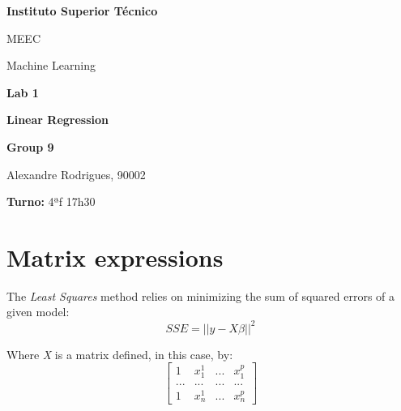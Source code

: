 \documentclass[a4paper,2pt]{report}
\begin{document}
\begin{titlepage}
    \begin{center}
        \vspace*{3cm}
 
        \LARGE
        \textbf{Instituto Superior Técnico}
        \vskip 0.4cm
 
        \Large{MEEC}
        \vskip 0.2cm

        \Large{Machine Learning}
        \vskip 3cm
        

 
        \Huge{\textbf{Lab 1}}
        \vskip 0.5cm

        \huge{\textbf{Linear Regression}}
        \vskip 0.5cm

 
        \vfill
 
        \large
        \textbf{Group 9}\\
        \vspace{0.3cm}
        
        Alexandre Rodrigues, 90002\\
        
        \vspace{1cm}

        \textbf{Turno:} 4ªf 17h30

    \end{center}
\end{titlepage}

\tableofcontents
\newpage

\setcounter{chapter}{1}
\section{Matrix expressions}

    \par The \textit{Least Squares} method relies on minimizing the sum of squared errors of a given model:
    \begin{equation}
        \textit{SSE} = ||y - X\beta||^2
    \end{equation}

    \par Where \textit{X} is a matrix defined, in this case, by:
    \begin{equation}
        \begin{bmatrix}
            1 & x_1^1 & \textit{...} & x_1^p\\
            \textit{...} & \textit{...} & \textit{...} & \textit{...}\\
            1 & x_n^1 & \textit{...} & x_n^p
        \end{bmatrix}
    \end{equation}
\end{document}
